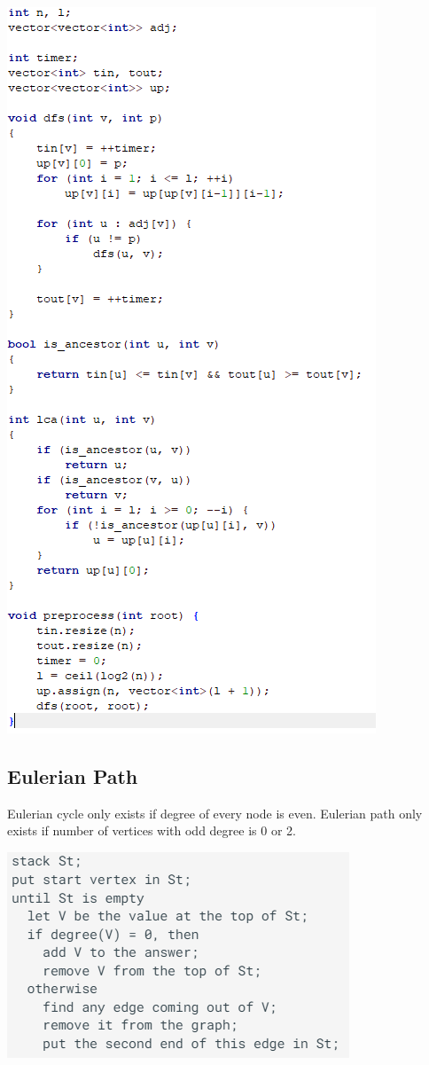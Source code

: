 \documentclass[11pt,twocolumn]{article}
\begin{document}
\includegraphics[scale=0.7]{lca}

\subsection{Eulerian Path}
Eulerian cycle only exists if degree of every node is even.
Eulerian path only exists if number of vertices with odd degree is 0 or 2.

\includegraphics[scale=0.7]{eulerianpath}
    
\end{document}
